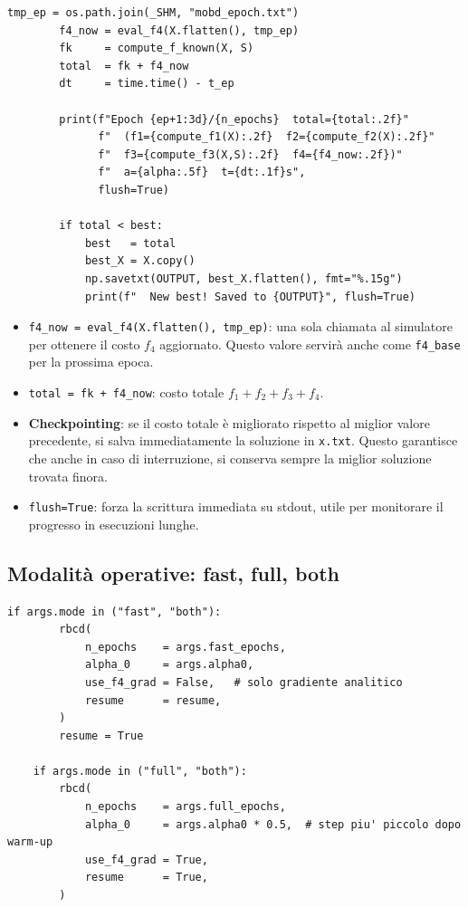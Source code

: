 \documentclass[12pt,a4paper]{article}
\theoremstyle{definition}
\begin{document}
\begin{lstlisting}[caption={Righe 292–311 — Fine epoca: valutazione, log e checkpointing}]
        tmp_ep = os.path.join(_SHM, "mobd_epoch.txt")
        f4_now = eval_f4(X.flatten(), tmp_ep)
        fk     = compute_f_known(X, S)
        total  = fk + f4_now
        dt     = time.time() - t_ep

        print(f"Epoch {ep+1:3d}/{n_epochs}  total={total:.2f}"
              f"  (f1={compute_f1(X):.2f}  f2={compute_f2(X):.2f}"
              f"  f3={compute_f3(X,S):.2f}  f4={f4_now:.2f})"
              f"  a={alpha:.5f}  t={dt:.1f}s",
              flush=True)

        if total < best:
            best   = total
            best_X = X.copy()
            np.savetxt(OUTPUT, best_X.flatten(), fmt="%.15g")
            print(f"  New best! Saved to {OUTPUT}", flush=True)
\end{lstlisting}

\begin{itemize}[nosep]
  \item \texttt{f4\_now = eval\_f4(X.flatten(), tmp\_ep)}: una sola chiamata al simulatore
        per ottenere il costo $f_4$ aggiornato. Questo valore servirà anche come
        \texttt{f4\_base} per la prossima epoca.
  \item \texttt{total = fk + f4\_now}: costo totale $f_1 + f_2 + f_3 + f_4$.
  \item \textbf{Checkpointing}: se il costo totale è migliorato rispetto al miglior valore
        precedente, si salva immediatamente la soluzione in \texttt{x.txt}.
        Questo garantisce che anche in caso di interruzione, si conserva sempre la miglior
        soluzione trovata finora.
  \item \texttt{flush=True}: forza la scrittura immediata su stdout, utile per monitorare
        il progresso in esecuzioni lunghe.
\end{itemize}

\subsection{Modalità operative: fast, full, both}

\begin{lstlisting}[caption={Righe 363–391 — Entry point con le tre modalità}]
    if args.mode in ("fast", "both"):
        rbcd(
            n_epochs    = args.fast_epochs,
            alpha_0     = args.alpha0,
            use_f4_grad = False,   # solo gradiente analitico
            resume      = resume,
        )
        resume = True

    if args.mode in ("full", "both"):
        rbcd(
            n_epochs    = args.full_epochs,
            alpha_0     = args.alpha0 * 0.5,  # step piu' piccolo dopo warm-up
            use_f4_grad = True,
            resume      = True,
        )
\end{lstlisting}
\end{document}
